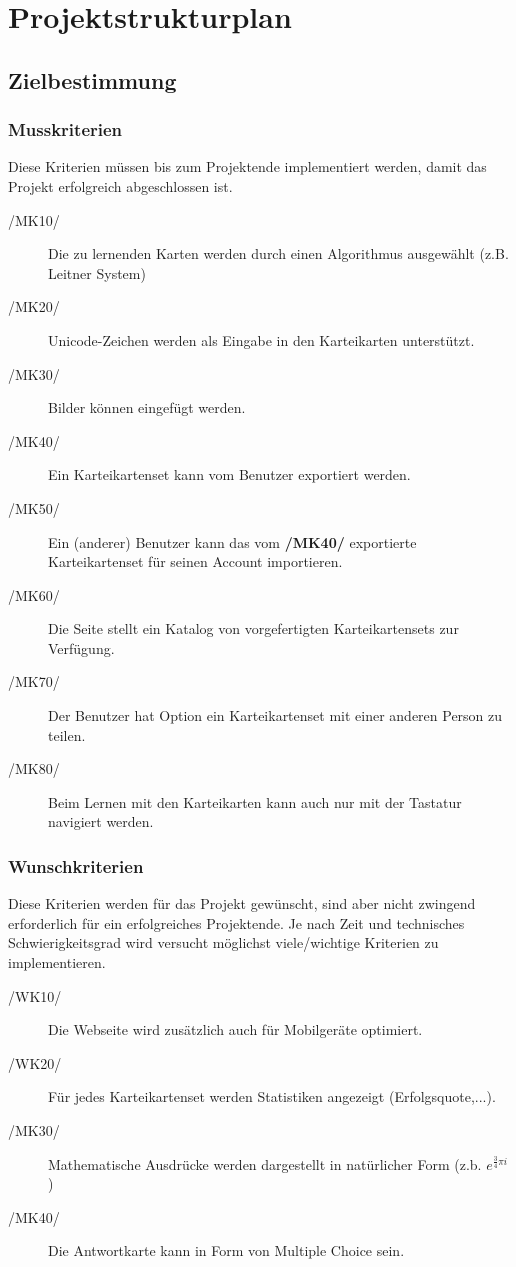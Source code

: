 \section{Projektstrukturplan}

\subsection{Zielbestimmung}
\subsubsection{Musskriterien}
Diese Kriterien müssen bis zum Projektende implementiert werden, damit das Projekt erfolgreich abgeschlossen ist.

\begin{description}
	\item[/MK10/] Die zu lernenden Karten werden durch einen Algorithmus ausgewählt (z.B. Leitner System)
	\item[/MK20/] Unicode-Zeichen werden als Eingabe in den Karteikarten unterstützt.
	\item[/MK30/] Bilder können eingefügt werden.
	\item[/MK40/] Ein Karteikartenset kann vom Benutzer exportiert werden.
	\item[/MK50/] Ein (anderer) Benutzer kann das vom \textbf{/MK40/} exportierte Karteikartenset für seinen Account importieren.
	\item[/MK60/] Die Seite stellt ein Katalog von vorgefertigten Karteikartensets zur Verfügung.
	\item[/MK70/] Der Benutzer hat Option ein Karteikartenset mit einer anderen Person zu teilen.
	\item[/MK80/] Beim Lernen mit den Karteikarten kann auch nur mit der Tastatur navigiert werden.
\end{description}

\subsubsection{Wunschkriterien}
Diese Kriterien werden für das Projekt gewünscht, sind aber nicht zwingend erforderlich für ein erfolgreiches Projektende. Je nach Zeit und technisches Schwierigkeitsgrad wird versucht möglichst viele/wichtige Kriterien zu implementieren.

\begin{description}
	\item[/WK10/] Die Webseite wird zusätzlich auch für Mobilgeräte optimiert.
	\item[/WK20/] Für jedes Karteikartenset werden Statistiken angezeigt (Erfolgsquote,...).
	\item[/MK30/] Mathematische Ausdrücke werden dargestellt in natürlicher Form (z.b. \( e^{\frac{3}{4}\pi i}\))
	\item[/MK40/] Die Antwortkarte kann in Form von Multiple Choice sein.
\end{description}

